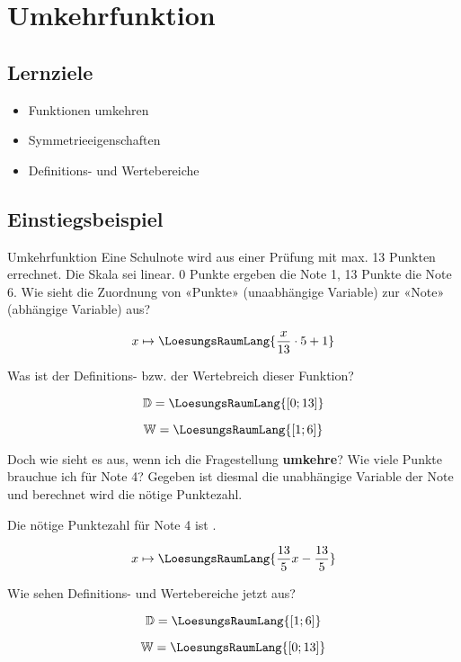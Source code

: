 \section{Umkehrfunktion}

\subsection{Lernziele}

\begin{itemize}
\item Funktionen umkehren
\item Symmetrieeigenschaften
\item Definitions- und Wertebereiche
\end{itemize} 
\newpage

\subsection{Einstiegsbeispiel}
\begin{beispiel}{Umkehrfunktion}{}
  Eine Schulnote wird aus einer Prüfung mit max. 13 Punkten errechnet.
  Die Skala sei linear. 0 Punkte ergeben die Note 1, 13 Punkte die
  Note 6. Wie sieht die Zuordnung von «Punkte» (unaabhängige Variable)
  zur «Note» (abhängige Variable) aus?

  \leserluft
  
  $$x \mapsto  \LoesungsRaumLang{\frac{x}{13}\cdot{} 5 + 1}$$

  Was ist der Definitions- bzw. der Wertebreich dieser Funktion?

  \leserluft
  
  $$\mathbb{D} = \LoesungsRaumLang{[0; 13]}$$

  \leserluft
  
  $$\mathbb{W} = \LoesungsRaumLang{[1; 6]}$$

  Doch wie sieht es aus, wenn ich die Fragestellung \textbf{umkehre}?
  Wie viele Punkte brauchue ich für Note 4? Gegeben ist diesmal die
  unabhängige Variable der Note und berechnet wird die nötige
  Punktezahl.

  \leserluft{}
  
  Die nötige Punktezahl für Note 4 ist .

  \leserluft{}
  
  $$x \mapsto \LoesungsRaumLang{\frac{13}5 x - \frac{13}5}$$

    Wie sehen Definitions- und Wertebereiche jetzt aus?

    $$\mathbb{D} = \LoesungsRaumLang{ [1; 6] }$$


    $$\mathbb{W} = \LoesungsRaumLang{ [0;13] }$$
  
\end{beispiel}
\newpage

